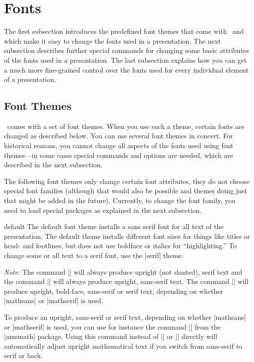%
%
%

\section{Fonts}
\label{section-fonts}

The first subsection introduces the predefined font themes that come with \beamer\ and which make it easy to change the fonts used in a presentation. The next subsection describes further special commands for changing some basic attributes of the fonts used in a presentation. The last subsection explains how you can get a much more fine-grained control over the fonts used for every individual element of a presentation.


\subsection{Font Themes}

\beamer\ comes with a set of font themes. When you use such a theme, certain fonts are changed as described below. You can use several font themes in concert. For historical reasons, you cannot change all aspects of the fonts used using font themes---in some cases special commands and options are needed, which are described in the next subsection.

The following font themes only change certain font attributes, they do not choose special font families (although that would also be possible and themes doing just that might be added in the future). Currently, to change the font family, you need to load special packages as explained in the next subsection.


\begin{fontthemeexample}{default}
  The default font theme installs a sans serif font for all text of the presentation. The default theme installs different font sizes for things like titles or head- and footlines, but does not use boldface or italics for ``highlighting.'' To change some or all text to a serif font, use the |serif| theme.

  \emph{Note:} The command |\mathrm| will always produce upright (not slanted), serif text and the command |\mathsf| will always produce upright, sans-serif text. The command |\mathbf| will produce upright, bold-face, sans-serif or serif text, depending on whether |mathsans| or |mathserif| is used.

  To produce an upright, sans-serif or serif text, depending on whether |mathsans| or |mathserif| is used, you can use for instance the command |\operatorname| from the |amsmath| package. Using this command instead of |\mathrm| or |\mathsf| directly will automatically adjust upright mathematical text if you switch from sans-serif to serif or back.
\end{fontthemeexample}

